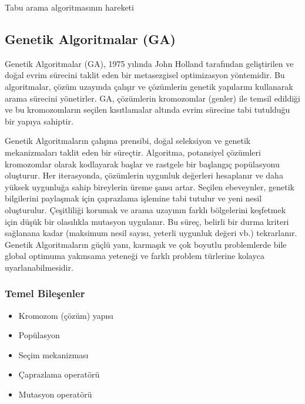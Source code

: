 \begin{marginfigure}
\centering
{}
\caption{Tabu arama algoritmasının hareketi}
\label{fig:tabu_search}
\end{marginfigure}

\subsection{Genetik Algoritmalar (GA)}
Genetik Algoritmalar (GA), 1975 yılında John Holland tarafından geliştirilen ve doğal evrim sürecini taklit eden bir metasezgisel optimizasyon yöntemidir. Bu algoritmalar, çözüm uzayında çalışır ve çözümlerin genetik yapılarını kullanarak arama sürecini yönetirler. GA, çözümlerin kromozomlar (genler) ile temsil edildiği ve bu kromozomların seçilen kısıtlamalar altında evrim sürecine tabi tutulduğu bir yapıya sahiptir.

Genetik Algoritmaların çalışma prensibi, doğal seleksiyon ve genetik mekanizmaları taklit eden bir süreçtir. Algoritma, potansiyel çözümleri kromozomlar olarak kodlayarak başlar ve rastgele bir başlangıç popülasyonu oluşturur. Her iterasyonda, çözümlerin uygunluk değerleri hesaplanır ve daha yüksek uygunluğa sahip bireylerin üreme şansı artar. Seçilen ebeveynler, genetik bilgilerini paylaşmak için çaprazlama işlemine tabi tutulur ve yeni nesil oluşturulur. Çeşitliliği korumak ve arama uzayının farklı bölgelerini keşfetmek için düşük bir olasılıkla mutasyon uygulanır. Bu süreç, belirli bir durma kriteri sağlanana kadar (maksimum nesil sayısı, yeterli uygunluk değeri vb.) tekrarlanır. Genetik Algoritmaların güçlü yanı, karmaşık ve çok boyutlu problemlerde bile global optimuma yakınsama yeteneği ve farklı problem türlerine kolayca uyarlanabilmesidir.

\subsubsection{Temel Bileşenler}
\begin{itemize}
    \item Kromozom (çözüm) yapısı
    \item Popülasyon
    \item Seçim mekanizması
    \item Çaprazlama operatörü
    \item Mutasyon operatörü
\end{itemize}

